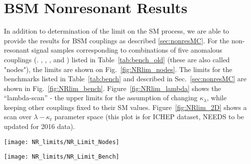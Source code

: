 \section{BSM Nonresonant Results}
\label{sec:nonresonant-results}


In addition to determination of the limit on the SM process, we are
able to provide the results for BSM couplings as described
\ref{sec:nonresMC}.  For the non-resonant signal samples corresponding
to combinations of five anomalous couplings (\kapl. \kapt, \ctwo,
\ctwog, and \cg) listed in Table~\ref{tab:bench_old} (these are also
called "nodes"), the limits are shown on Fig.~\ref{fig:NRlim_nodes}.
The limits for the benchmarks listed in Table~\ref{tab:bench} and
described in Sec.~\ref{sec:nonresMC} are shown in
Fig.~\ref{fig:NRlim_bench}.  Figure~\ref{fig:NRlim_lambda} shows the
``lambda-scan'' - the upper limits for the assumption of changing
$\kappa_\lambda$, while keeping other couplings fixed to their SM
values. Figure~\ref{fig:NRlim_2D} shows a scan over $\lambda-\kappa_t$
parameter space (this plot is for ICHEP dataset, NEEDS to be updated
for 2016 data).

% 

\begin{figure*}[thb]
  \centering
  \texttt{[image: NR\_limits/NR\_Limit\_Nodes]}\hfil
  \caption{Limits for Nodes specified in Table~\ref{tab:bench_old}.}
  \label{fig:NRlim_nodes}
\end{figure*}

\begin{figure*}[thb]
  \centering
  \texttt{[image: NR\_limits/NR\_Limit\_Bench]}\hfil
  \caption{Limits for Benchmarks described in Sec.~\ref{sec:nonresMC} in Table~\ref{tab:bench}.}
  \label{fig:NRlim_bench}
\end{figure*}



